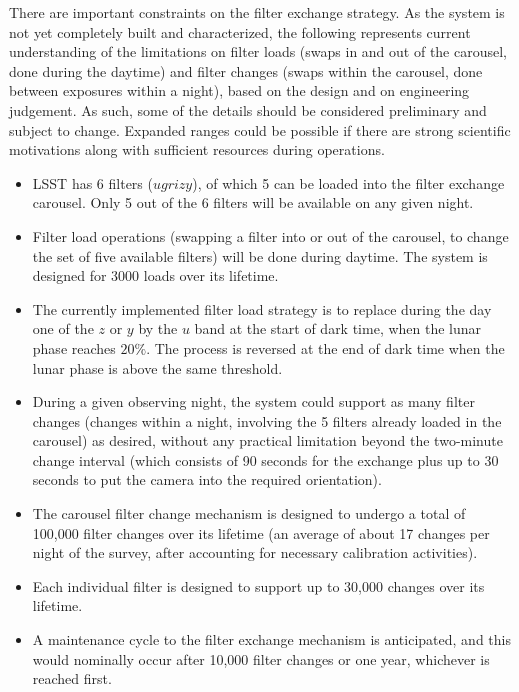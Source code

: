 \documentclass[DM,toc,usenatbib]{lsstdoc}
\begin{document}
There are important constraints on the filter exchange strategy. As the system is not yet completely 
built and characterized, the following represents current understanding of the limitations on filter 
loads (swaps in and out of the carousel, done during the daytime) and filter changes (swaps within
the carousel, done between exposures within a night), based on the design and on 
engineering judgement. As such, some of the details should be considered preliminary and subject 
to change. Expanded ranges could be possible if there are strong scientific motivations along with
sufficient resources during operations. 
\begin{itemize}
\item LSST has 6 filters ($ugrizy$), of which 5 can be loaded into the filter exchange carousel. Only 5 out of
the 6 filters will be available on any given night. 
\item Filter load operations (swapping a filter into or out of the carousel, to change the set of five available filters) 
	will be done during daytime. The system is designed for 3000 loads over its lifetime. 
\item The currently implemented filter load strategy is to replace during the day one of the $z$ or $y$ 
	by the $u$ band at the start of dark time, when the lunar phase reaches $20\%$. The 
	process is reversed at the end of dark time when the lunar phase is above the same threshold.
\item During a given observing night, the system could support as many filter changes (changes within a night, 
	involving the 5 filters already loaded in the carousel) as desired, without any practical limitation beyond 
	the two-minute change interval (which consists of 90 seconds for the exchange plus up to 30 seconds 
	to put the camera into the required orientation). 
\item The carousel filter change mechanism is designed to undergo a total of 100,000 filter changes over its lifetime 
	(an average of about 17 changes per night of the survey, after accounting for necessary calibration activities). 
\item Each individual filter is designed to support up to 30,000 changes over its lifetime.
\item A maintenance cycle to the filter exchange mechanism is anticipated, and this would nominally occur after 10,000 filter changes or one year, whichever is reached first. 
\end{itemize} 


\end{document}
